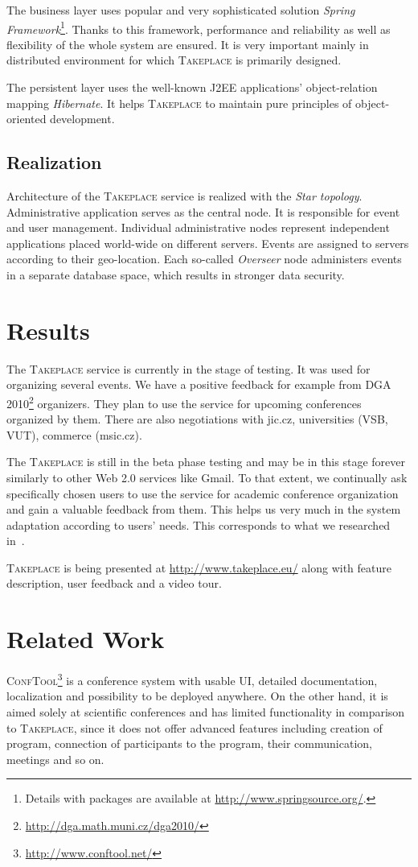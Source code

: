 \documentclass[conference]{IEEEtran}
\newcommand\tp{\textsc{Takeplace}\xspace}
\begin{document}
The business layer uses popular and very sophisticated solution \emph{Spring
Framework}\footnote{Details with packages are available at
\url{http://www.springsource.org/}.}. Thanks to this framework, performance and reliability as well as
flexibility of the whole system are ensured. It is very important mainly in
distributed environment for which \tp is primarily designed.

The persistent layer uses the well-known J2EE applications' object-relation
mapping \emph{Hibernate}. It helps \tp to maintain pure principles of
object-oriented development.

\subsection{Realization}
Architecture of the \tp service is realized with the \emph{Star
topology}.
Administrative application serves as the central node. It is responsible for
event and user management. Individual administrative nodes represent
independent applications placed world-wide on different servers. Events are
assigned to servers according to their geo-location. Each so-called
\emph{Overseer} node administers events in a separate database space, which
results in stronger data security.

\section{Results}
The \tp service is currently in the stage of testing. It was used for
organizing several events. We have a positive feedback for example from DGA
2010\footnote{\url{http://dga.math.muni.cz/dga2010/}} organizers. They plan to
use the service for upcoming conferences organized by them. There are also
negotiations with jic.cz, universities (VSB, VUT), commerce (msic.cz).

The \tp is still in the beta phase testing and may be in this stage forever
similarly to other Web 2.0 services like Gmail. To that extent, we continually
ask specifically chosen users to use the service for academic conference
organization and gain a valuable feedback from them. This helps us very much
in the system adaptation according to users' needs. This corresponds to what
we researched in~\cite{user-centered2010}.

\tp is being presented at \url{http://www.takeplace.eu/} along with feature
description, user feedback and a video tour.

\section{Related Work}
\label{sec.related}
\textsc{ConfTool}\footnote{\url{http://www.conftool.net/}} is a conference
system with usable UI, detailed documentation, localization and possibility to
be deployed anywhere. On the other hand, it is aimed solely at scientific
conferences and has limited functionality in comparison to \tp, since it does
not offer advanced features including creation of program, connection of
participants to the program, their communication, meetings and so on.
\end{document}

